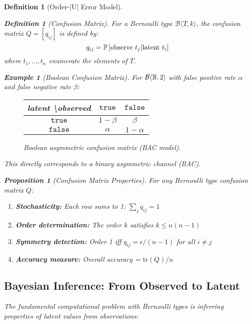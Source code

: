 \documentclass[11pt,final,hidelinks]{article}
\newtheorem{proposition}[theorem]{Proposition}
\newtheorem{definition}[theorem]{Definition}
\newtheorem{example}[theorem]{Example}
\newcommand{\bernoulli}[2]{\mathcal{B}\langle #1, #2 \rangle}
\begin{document}
\begin{definition}[Order-|U| Error Model]
\begin{definition}[Confusion Matrix]
For a Bernoulli type $\bernoulli{T}{k}$, the confusion matrix $Q = [q_{ij}]$ is defined by:
\begin{equation}
q_{ij} = \mathbb{P}\left[\text{observe } t_j | \text{latent } t_i\right]
\end{equation}
where $t_1, \ldots, t_n$ enumerate the elements of $T$.
\end{definition}

\begin{example}[Boolean Confusion Matrix]
For $\bernoulli{\Bool}{2}$ with false positive rate $\alpha$ and false negative rate $\beta$:
\begin{figure}[t]
\centering
\begin{tabular}{c|cc}
latent \textbackslash observed & $\mathtt{true}$ & $\mathtt{false}$ \\
\hline
$\mathtt{true}$ & $1-\beta$ & $\beta$ \\
$\mathtt{false}$ & $\alpha$ & $1-\alpha$
\end{tabular}
\caption{Boolean asymmetric confusion matrix (BAC model).}
\end{figure}
This directly corresponds to a binary asymmetric channel (BAC).
\end{example}

\begin{proposition}[Confusion Matrix Properties]
For any Bernoulli type confusion matrix $Q$:
\begin{enumerate}
    \item \textbf{Stochasticity:} Each row sums to 1: $\sum_j q_{ij} = 1$
    \item \textbf{Order determination:} The order $k$ satisfies $k \leq n(n-1)$
    \item \textbf{Symmetry detection:} Order 1 iff $q_{ij} = \epsilon/(n-1)$ for all $i \neq j$
    \item \textbf{Accuracy measure:} Overall accuracy = $\text{tr}(Q)/n$
\end{enumerate}
\end{proposition}

\subsection{Bayesian Inference: From Observed to Latent}

The fundamental computational problem with Bernoulli types is inferring properties of latent values from observations:


\end{definition}
\end{document}
